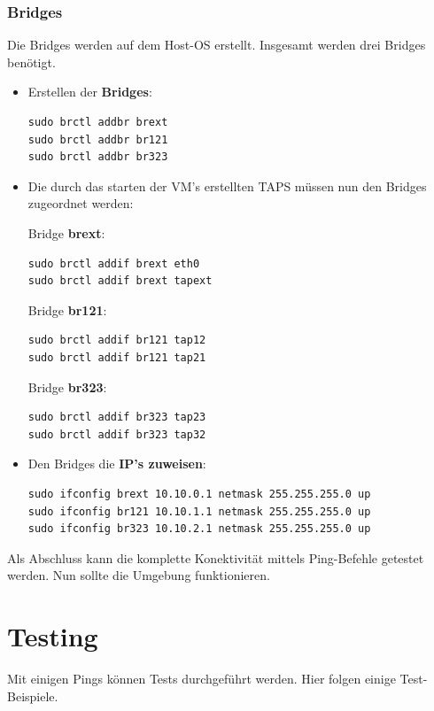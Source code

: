 \documentclass[a4,12pt]{scrartcl}
\begin{document}
\subsubsection{Bridges}
Die Bridges werden auf dem Host-OS erstellt. Insgesamt werden drei Bridges benötigt. 
\begin{itemize}
\item Erstellen der \textbf{Bridges}:
\begin{lstlisting}
sudo brctl addbr brext
sudo brctl addbr br121
sudo brctl addbr br323
\end{lstlisting}

\item Die durch das starten der VM's erstellten TAPS müssen nun den Bridges zugeordnet werden:
\newline

Bridge \textbf{brext}:
\begin{lstlisting}
sudo brctl addif brext eth0
sudo brctl addif brext tapext
\end{lstlisting}

Bridge \textbf{br121}:
\begin{lstlisting}
sudo brctl addif br121 tap12
sudo brctl addif br121 tap21
\end{lstlisting}

Bridge \textbf{br323}:
\begin{lstlisting}
sudo brctl addif br323 tap23
sudo brctl addif br323 tap32
\end{lstlisting}


\item Den Bridges die \textbf{IP's zuweisen}:
\begin{lstlisting}
sudo ifconfig brext 10.10.0.1 netmask 255.255.255.0 up
sudo ifconfig br121 10.10.1.1 netmask 255.255.255.0 up
sudo ifconfig br323 10.10.2.1 netmask 255.255.255.0 up
\end{lstlisting}
\end{itemize}
Als Abschluss kann die komplette Konektivität mittels Ping-Befehle getestet werden. Nun sollte die Umgebung funktionieren. 
\newpage

\section{Testing}
Mit einigen Pings können Tests durchgeführt werden. Hier folgen einige Test-Beispiele. 
\end{document}
